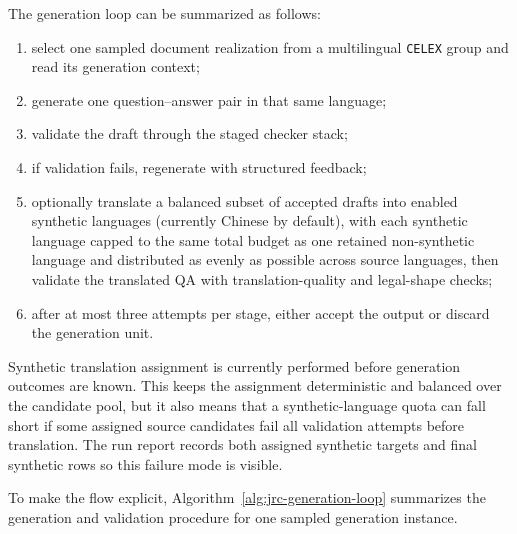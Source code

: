 The generation loop can be summarized as follows:
\begin{enumerate}
\item select one sampled document realization from a multilingual \texttt{CELEX} group and read its generation context;
\item generate one question--answer pair in that same language;
\item validate the draft through the staged checker stack;
\item if validation fails, regenerate with structured feedback;
\item optionally translate a balanced subset of accepted drafts into enabled synthetic languages (currently Chinese by default), with each synthetic language capped to the same total budget as one retained non-synthetic language and distributed as evenly as possible across source languages, then validate the translated QA with translation-quality and legal-shape checks;
\item after at most three attempts per stage, either accept the output or discard the generation unit.
\end{enumerate}

Synthetic translation assignment is currently performed before generation outcomes are known. This keeps the assignment deterministic and balanced over the candidate pool, but it also means that a synthetic-language quota can fall short if some assigned source candidates fail all validation attempts before translation. The run report records both assigned synthetic targets and final synthetic rows so this failure mode is visible.

To make the flow explicit, Algorithm~\ref{alg:jrc-generation-loop} summarizes the generation and validation procedure for one sampled generation instance.

